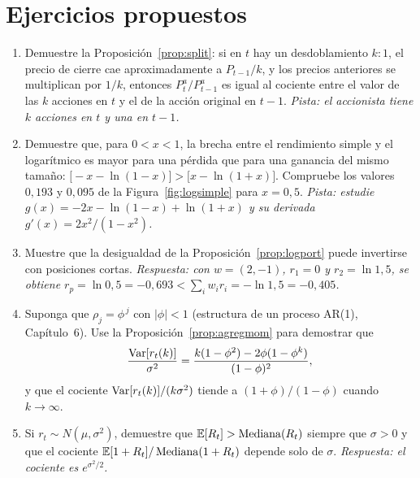 \section{Ejercicios propuestos}

\begin{enumerate}[label=\textbf{\thechapter.\arabic*},leftmargin=*,itemsep=6pt]
  \item\label{prop:ejsplit} Demuestre la Proposición~\ref{prop:split}: si en $t$ hay un desdoblamiento
  $k\!:\!1$, el precio de cierre cae aproximadamente a $P_{t-1}/k$, y los precios anteriores se
  multiplican por $1/k$, entonces $P^a_t/P^a_{t-1}$ es igual al cociente entre el valor de las $k$
  acciones en $t$ y el de la acción original en $t-1$.
  \textit{Pista: el accionista tiene $k$ acciones en $t$ y una en $t-1$.}

  \item\label{prop:ejasimetria} Demuestre que, para $0<x<1$, la brecha entre el rendimiento simple y el
  logarítmico es mayor para una pérdida que para una ganancia del mismo tamaño:
  $\bigl[-x-\ln(1-x)\bigr]>\bigl[x-\ln(1+x)\bigr]$. Compruebe los valores $0{,}193$ y $0{,}095$ de la
  Figura~\ref{fig:logsimple} para $x=0{,}5$.
  \textit{Pista: estudie $g(x)=-2x-\ln(1-x)+\ln(1+x)$ y su derivada $g'(x)=2x^2/(1-x^2)$.}

  \item\label{prop:ejcorto} Muestre que la desigualdad de la Proposición~\ref{prop:logport} puede
  invertirse con posiciones cortas. \textit{Respuesta: con $w=(2,-1)$, $r_1=0$ y $r_2=\ln 1{,}5$,
  se obtiene $r_p=\ln 0{,}5=-0{,}693<\sum_iw_ir_i=-\ln1{,}5=-0{,}405$.}

  \item Suponga que $\rho_j=\phi^{\,j}$ con $|\phi|<1$ (estructura de un proceso AR(1), Capítulo~6).
  Use la Proposición~\ref{prop:agregmom} para demostrar que
  \[
    \frac{\operatorname{Var}[r_t(k)]}{\sigma^2}=\frac{k(1-\phi^2)-2\phi(1-\phi^k)}{(1-\phi)^2},
  \]
  y que el cociente $\operatorname{Var}[r_t(k)]/(k\sigma^2)$ tiende a $(1+\phi)/(1-\phi)$ cuando $k\to\infty$.

  \item Si $r_t\sim N(\mu,\sigma^2)$, demuestre que $\mathbb{E}[R_t]>\operatorname{Mediana}(R_t)$ siempre que
  $\sigma>0$ y que el cociente $\mathbb{E}[1+R_t]/\operatorname{Mediana}(1+R_t)$ depende solo de $\sigma$.
  \textit{Respuesta: el cociente es $e^{\sigma^2/2}$.}


\end{enumerate}
